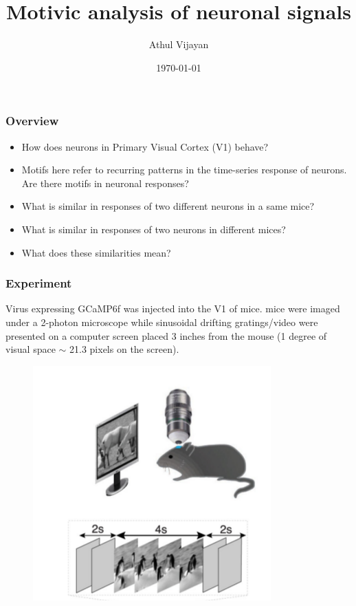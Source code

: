 \documentclass{beamer}
\title[Motivic analysis]{Motivic analysis of neuronal signals} %
\author{Athul Vijayan} %
\institute[DON Lab] %
{
IIT Madras \\ %
\medskip
\textit{athulvijayan6@gmail.com} %
}
\date{\today} %
\begin{document}
\begin{frame}
\titlepage %
\end{frame}


\begin{frame}
\frametitle{Overview}
\begin{itemize}
    \item How does neurons in Primary Visual Cortex (V1) behave?
    \item Motifs here refer to recurring patterns in the time-series response of neurons. Are there motifs in neuronal responses?
    \item What is similar in responses of two different neurons in a same mice?
    \item What is similar in responses of two neurons in different mices?
    \item What does these similarities mean?
\end{itemize}
\end{frame}

\begin{frame}
\frametitle{Experiment}
Virus expressing GCaMP6f was injected into the V1 of mice. mice were imaged under a 2-photon microscope while sinusoidal drifting gratings/video were presented on a computer screen placed 3 inches from the mouse (1 degree of visual space $\sim$ 21.3 pixels on the screen).
\begin{figure}
\includegraphics[width=0.4\linewidth]{img/exp.png}
\end{figure}
\end{frame}
\end{document}
